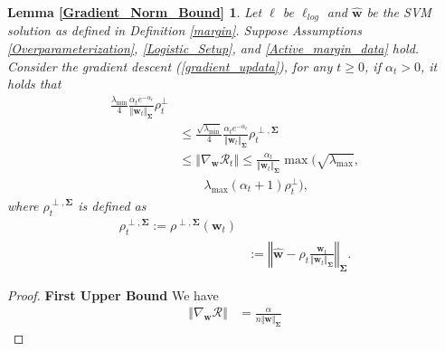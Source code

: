 \documentclass[pdflatex,sn-basic]{sn-jnl}%
\theoremstyle{thmstyleone}%
\begin{document}
\begin{appendices}
\newtheorem*{restate_Gradient_Norm_Bound}{Lemma \ref{Gradient_Norm_Bound}}
\begin{restate_Gradient_Norm_Bound}\label{restate_Gradient_Norm_Bound_ref}
  Let $\ell$ be $\ell_{log}$ and $\hat{\mathbf{w}}$ be the SVM solution as defined in Definition \ref{margin}. 
  Suppose Assumptions \ref{Overparameterization}, \ref{Logistic_Setup}, and \ref{Active_margin_data} hold. 
  Consider the gradient descent (\ref{gradient_updata}), for any $t \ge 0$, if $\alpha_t>0$, it holds that 
  \begin{equation*}
  \begin{aligned}
    \frac{\lambda_{\min}}{4}
    \frac{\alpha_t e^{-\alpha_t}}{\Vert \mathbf{w}_t \Vert_{\mathbf{\Sigma}}}
    \rho_t^{\perp}
    \\ & \le 
    \frac{\sqrt{\lambda_{\min}}}{4}
    \frac{\alpha_t e^{-\alpha_t}}{\Vert \mathbf{w}_t \Vert_{\mathbf{\Sigma}}}
    \rho_t^{\perp, \mathbf{\Sigma}}
    \\ & \le 
    \left\Vert 
      \nabla_{\mathbf{w}} \mathcal{R}_t
    \right\Vert
    \le 
    \frac{\alpha_t}{\Vert \mathbf{w}_t \Vert_{\mathbf{\Sigma}}}
    \max \Big(
      \sqrt{\lambda_{\max}},
      \\
      & \qquad \lambda_{\max}
      \left( \alpha_t + 1 \right)
      \rho_t^{\perp}
    \Big),
  \end{aligned}
  \end{equation*}
  where $\rho_t^{\perp, \mathbf{\Sigma}}$ is defined as 
  \begin{equation*}
  \begin{aligned}
    \rho_t^{\perp, \mathbf{\Sigma}} 
    := \rho^{\perp, \mathbf{\Sigma}} \left( \mathbf{w}_t \right)
    \\ & :=
    \left\Vert
      \hat{\mathbf{w}}
      -
      \rho_t
      \frac{\mathbf{w}_t}{\Vert \mathbf{w}_t \Vert_\mathbf{\Sigma}}
    \right\Vert_\mathbf{\Sigma}.
  \end{aligned} 
  \end{equation*}    
\end{restate_Gradient_Norm_Bound}
\begin{proof}
  \noindent\textbf{First Upper Bound}
  We have 
  \begin{equation*}
  \begin{aligned}
    \left\Vert 
      \nabla_{\mathbf{w}} \mathcal{R}
    \right\Vert
    & =
    \frac{\alpha}{n \Vert \mathbf{w} \Vert_{\mathbf{\Sigma}}}

\end{aligned}
\end{equation*}
\end{proof}
\end{appendices}
\end{document}
